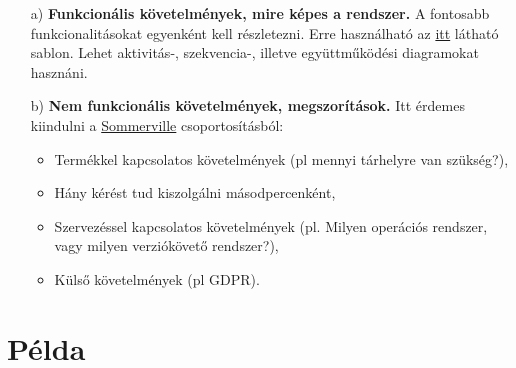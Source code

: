 \begin{enumerate}
	\item[a)] \textbf{Funkcionális követelmények, mire képes a rendszer.} A fontosabb funkcionalitásokat egyenként kell részletezni. Erre használható az \href{https://www.businessanalystlearnings.com/blog/2013/9/30/the-3-step-guide-to-documenting-requirements-with-use-cases}{itt} látható sablon. Lehet aktivitás-, szekvencia-, illetve együttműködési diagramokat hasznáni.
	\item[b)] \textbf{Nem funkcionális követelmények, megszorítások.} Itt érdemes kiindulni a \href{https://cs.ccsu.edu/~stan/classes/CS410/notes16/04-Requirements.html}{Sommerville} csoportosításból: 
	
	\begin{itemize}
		\item Termékkel kapcsolatos követelmények (pl mennyi tárhelyre van szükség?), 
		\item Hány kérést tud kiszolgálni másodpercenként, 
		\item Szervezéssel kapcsolatos követelmények (pl. Milyen operációs rendszer, vagy milyen verziókövető rendszer?),
		\item Külső követelmények (pl GDPR).
	\end{itemize}
	
	
	
	
	
	
	
\end{enumerate}






\section {P\'elda}

